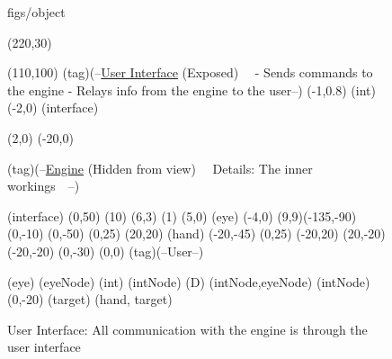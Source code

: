 





\begin {figure}


\Draw


 {figs/object}

\MinNodeSize(220,30)

\MinNodeSize(110,100)
\RectNode(tag)(--\underline{User Interface}
		(Exposed)~~
		- Sends commands to the engine
		- Relays info from the engine \hfill
		to the user--)
{ \MoveToExit(-1,0.8) \MarkGLoc(int)      }
{ \MoveToExit(-2,0)  \MarkGLoc(interface)  }

\MoveToExit (2,0) \Move(-20,0)

\RectNode(tag)(--\underline{Engine}
		(Hidden from view)~~
		Details:
		The inner workings~~--)

\MoveToLoc(interface)
\Move(0,50)
\DrawCircle(10)
{ \Move(6,3) \PaintCircle(1) \Move (5,0) \MarkGLoc(eye)  	%
  \Move(-4,0) \DrawOvalArc (9,9)(-135,-90)			%
}
\Move (0,-10)
\Line(0,-50)
\Move(0,25) \Line(20,20) \FcNode(hand) 
\Move(-20,-45)
{ \Move(0,25) \Line(-20,20) }
{ \Line(20,-20) }
{ \Line(-20,-20) }
\Move(0,-30)
\MinNodeSize(0,0) \Node(tag)(--User--)

\MoveToLoc(eye) \FcNode(eyeNode)   
\MoveToLoc(int) \FcNode(intNode)   
\EdgeSpec(D)						%
\Edge (intNode,eyeNode)
\MoveToLoc(intNode) \Move (0,-20) \FcNode(target)
\Edge (hand, target)



\EndDraw

\caption {User Interface: All communication with 
the engine is through the user interface}


\label {fig:userInterface}

\end {figure}


